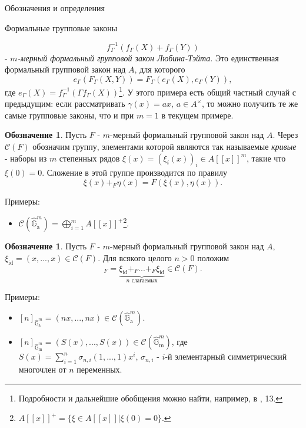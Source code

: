 \documentclass[a4paper,14pt]{extarticle}
\theoremstyle{definition}
\newtheorem{denotation}[definition]{Обозначение}
\newcommand{\id}{\mathrm{id}}
\newcommand{\bG}{\mathbb{G}}
\newcommand{\sC}{\mathscr{C}}
\newcommand{\GGa}{\hat{\bG}_{\mathrm{a}}}
\newcommand{\GGm}{\hat{\bG}_{\mathrm{m}}}
\begin{document}
\begin{section}{Обозначения и определения}
\begin{subsection}{Формальные групповые законы}
\begin{itemize}
\begin{equation*}
        f_\Gamma^{-1}(f_\Gamma(X) + f_\Gamma(Y))
    \end{equation*}
    - \textit{$m$-мерный формальный групповой закон Любина-Тэйта}. Это единственная формальный групповой закон над $A$, для которого
    \begin{equation*}
        e_\Gamma(F_\Gamma(X, Y)) =
        F_\Gamma(e_\Gamma(X), e_\Gamma(Y)),
    \end{equation*}
     где ${ e_\Gamma(X) = f_\Gamma^{-1}(\Gamma f_\Gamma(X)) }$\footnote{
        Подробности и дальнейшие обобщения можно найти, например, в \cite{Hazewinkel}, 13.
     }. У этого примера есть общий частный случай с предыдущим: если рассматривать ${ \gamma(x) = a x }$, ${ a \in A^\times }$, то можно получить те же самые групповые законы, что и при ${ m = 1 }$ в текущем примере.
\end{itemize}

\begin{denotation}\label{denote:2.1:curves_group}
    Пусть $F$ - $m$-мерный формальный групповой закон над $A$. Через ${ \sC(F) }$ обозначим группу, элементами которой являются так называемые \textit{кривые} - наборы из $m$ степенных рядов ${ \xi(x) = (\xi_i(x))_i \in A[[x]]^m }$, такие что ${\xi(0) = 0 }$. Сложение в этой группе производится по правилу
    \begin{equation*}
        \xi(x) +_F \eta(x) =
        F(\xi(x), \eta(x)).
    \end{equation*}
\end{denotation}

Примеры:
\begin{itemize}
    \item ${ \sC(\GGa^m) = \bigoplus\limits_{i = 1}^m A[[x]]^+ }$\footnote{
        ${ A[[x]]^+ = \{ \xi \in A[[x]] | \xi(0) = 0 \} }$.
    }.
\end{itemize}

\begin{denotation}\label{denote:2.2:[n]_F}
    Пусть $F$ - $m$-мерный формальный групповой закон над $A$, ${ \xi_\id = (x, ..., x) \in \sC(F) }$. Для всякого целого ${ n > 0 }$ положим
    \begin{equation*}
        [n]_F =
        \underbrace{
            \xi_\id +_F ... +_F \xi_\id
        }_{\text{$n$ слагаемых}} \in
        \sC(F).
    \end{equation*}
\end{denotation}

Примеры:
\begin{itemize}
    \item ${ [n]_{\GGa^m} = (n x, ..., n x) \in \sC(\GGa^m) }$.
    \item ${ [n]_{\GGm^m} = (S(x), ..., S(x)) \in \sC(\GGm^m) }$, где ${ S(x) = \sum\limits_{i = 1}^n \sigma_{n, i}(1, ..., 1) x^i }$, $\sigma_{n, i}$ - $i$-й элементарный симметрический многочлен от $n$ переменных.
\end{itemize}


\end{subsection}
\end{section}
\end{document}
